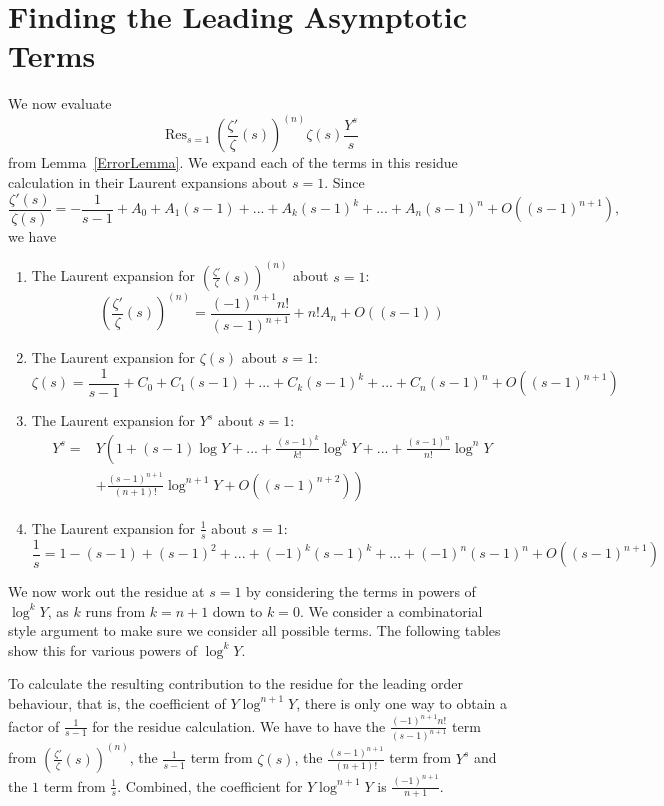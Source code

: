 \documentclass[12pt,a4paper,reqno]{amsart}
\DeclareMathOperator*{\Res}{Res}
\theoremstyle{remark}
\numberwithin{equation}{section}
\begin{document}
\section{Finding the Leading Asymptotic Terms}\label{sect:8}
We now evaluate
\[
\Res_{s=1} \left( \frac{\zeta'}{\zeta}(s) \right)^{(n)} \zeta(s) \frac{Y^s}{s}
\]
from Lemma~\ref{ErrorLemma}. We expand each of the terms in this residue calculation in their Laurent expansions about $s=1$. Since
\[
\frac{\zeta ' (s)}{\zeta (s)} = - \frac{1}{s-1} +A_0 + A_1 (s-1) +...+ A_k (s-1)^k + ... + A_n (s-1)^n +O((s-1)^{n+1}),
\]
we have

\begin{enumerate}
\item The Laurent expansion for $\left( \frac{\zeta'}{\zeta}(s) \right)^{(n)}$ about $s=1$:
\[
\left( \frac{\zeta'}{\zeta}(s) \right)^{(n)} = \frac{(-1)^{n+1} n!}{(s-1)^{n+1}} + n! A_n + O((s-1))
\]
\item The Laurent expansion for $\zeta(s)$ about $s=1$:
\[
\zeta(s) = \frac{1}{s-1} +C_0 + C_1 (s-1) +...+ C_k (s-1)^k +... + C_n (s-1)^n +O((s-1)^{n+1})
\]
\item The Laurent expansion for $Y^s$ about $s=1$:
\begin{align*}
Y^s =& Y \left( 1 + (s-1) \log Y +... + \frac{(s-1)^k}{k!} \log^k Y +...+  \frac{(s-1)^n}{n!} \log^n Y \right. \\
& \left.+  \frac{(s-1)^{n+1}}{(n+1)!} \log^{n+1} Y + O((s-1)^{n+2}) \right)
\end{align*}
\item The Laurent expansion for $\frac{1}{s}$ about $s=1$:
\[
\frac{1}{s} = 1 - (s-1) + (s-1)^2 +...+ (-1)^k (s-1)^k +... + (-1)^n (s-1)^n + O((s-1)^{n+1})
\]
\end{enumerate}
We now work out the residue at $s=1$ by considering the terms in powers of $\log^k Y$, as $k$ runs from $k=n+1$ down to $k=0$. We consider a combinatorial style argument to make sure we consider all possible terms. The following tables show this for various powers of $\log^k Y$.




To calculate the resulting contribution to the residue for the leading order behaviour, that is, the coefficient of $Y \log^{n+1} Y$, there is only one way to obtain a factor of $\frac{1}{s-1}$ for the residue calculation. We have to have the $\frac{(-1)^{n+1} n!}{(s-1)^{n+1}}$ term from $\left( \frac{\zeta'}{\zeta}(s) \right)^{(n)}$, the $\frac{1}{s-1}$ term from $\zeta (s)$, the $\frac{(s-1)^{n+1}}{(n+1)!}$ term from $Y^s$ and the $1$ term from $\frac{1}{s}$. Combined, the coefficient for $Y \log^{n+1} Y$ is $\frac{(-1)^{n+1}}{n+1}$.
\end{document}

